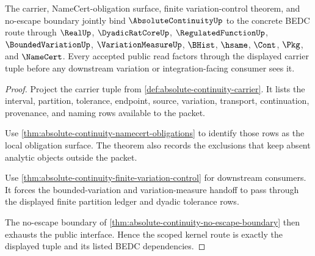 \begin{theorem}
\label{thm:absolute-continuity-scoped-kernel-route}
The carrier, NameCert-obligation surface, finite variation-control theorem, and no-escape boundary jointly bind $\AbsoluteContinuityUp$ to the concrete BEDC route through $\RealUp$, $\DyadicRatCoreUp$, $\RegulatedFunctionUp$, $\BoundedVariationUp$, $\VariationMeasureUp$, $\BHist$, $\hsame$, $\Cont$, $\Pkg$, and $\NameCert$. Every accepted public read factors through the displayed carrier tuple before any downstream variation or integration-facing consumer sees it.
\end{theorem}
\begin{proof}
Project the carrier tuple from \autoref{def:absolute-continuity-carrier}. It lists the interval, partition, tolerance, endpoint, source, variation, transport, continuation, provenance, and naming rows available to the packet.

Use \autoref{thm:absolute-continuity-namecert-obligations} to identify those rows as the local obligation surface. The theorem also records the exclusions that keep absent analytic objects outside the packet.

Use \autoref{thm:absolute-continuity-finite-variation-control} for downstream consumers. It forces the bounded-variation and variation-measure handoff to pass through the displayed finite partition ledger and dyadic tolerance rows.

The no-escape boundary of \autoref{thm:absolute-continuity-no-escape-boundary} then exhausts the public interface. Hence the scoped kernel route is exactly the displayed tuple and its listed BEDC dependencies.
\end{proof}


\begin{closurestatus}{\AbsoluteContinuityUp}
  \theoryclosure{\seedClosure}
  \formalstatus{\unformalizedV}
\end{closurestatus}
